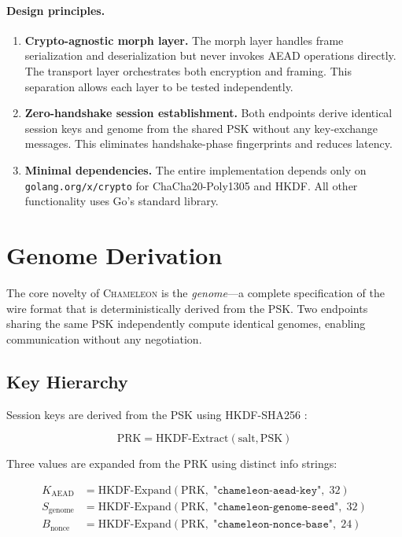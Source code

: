 \documentclass[11pt,a4paper]{article}
\let\oldparagraph\paragraph
\renewcommand{\paragraph}[1]{\needspace{5\baselineskip}\oldparagraph{#1}}
\newcommand{\chameleon}{\textsc{Chameleon}}
\begin{document}
\paragraph{Design principles.}
\begin{enumerate}[nosep]
  \item \textbf{Crypto-agnostic morph layer.} The morph layer handles frame serialization and deserialization but never invokes AEAD operations directly. The transport layer orchestrates both encryption and framing. This separation allows each layer to be tested independently.
  \item \textbf{Zero-handshake session establishment.} Both endpoints derive identical session keys and genome from the shared PSK without any key-exchange messages. This eliminates handshake-phase fingerprints and reduces latency.
  \item \textbf{Minimal dependencies.} The entire implementation depends only on \texttt{golang.org/x/crypto} for ChaCha20-Poly1305 and HKDF. All other functionality uses Go's standard library.
\end{enumerate}

\section{Genome Derivation}\label{sec:genome}

The core novelty of \chameleon{} is the \emph{genome}---a complete specification of the wire format that is deterministically derived from the PSK. Two endpoints sharing the same PSK independently compute identical genomes, enabling communication without any negotiation.

\subsection{Key Hierarchy}\label{sec:keys}

Session keys are derived from the PSK using HKDF-SHA256 \cite{rfc5869}:

\begin{equation}\label{eq:hkdf}
  \text{PRK} = \text{HKDF-Extract}(\text{salt}, \text{PSK})
\end{equation}

Three values are expanded from the PRK using distinct info strings:

\begin{align}
  K_{\text{AEAD}} &= \text{HKDF-Expand}(\text{PRK},\; \texttt{"chameleon-aead-key"},\; 32) \label{eq:aead_key}\\
  S_{\text{genome}} &= \text{HKDF-Expand}(\text{PRK},\; \texttt{"chameleon-genome-seed"},\; 32) \label{eq:genome_seed}\\
  B_{\text{nonce}} &= \text{HKDF-Expand}(\text{PRK},\; \texttt{"chameleon-nonce-base"},\; 24) \label{eq:nonce_base}
\end{align}
\end{document}
